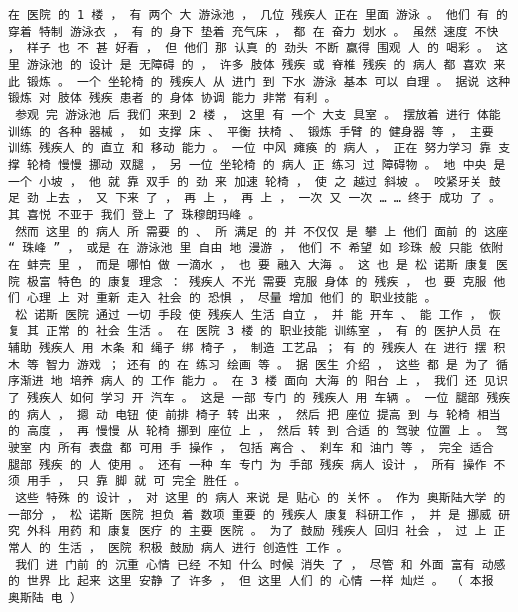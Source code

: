 \documentclass{article}
\begin{document}
\begin{Verbatim}[commandchars=\\\{\}]
 在 医院 的 1 楼 ， 有 两个 大 游泳池 ， 几位 残疾人 正在 里面 游泳 。 他们 有 的 穿着 特制 游泳衣 ， 有 的 身下 垫着 充气床 ， 都 在 奋力 划水 。 虽然 速度 不快 ， 样子 也 不 甚 好看 ， 但 他们 那 认真 的 劲头 不断 赢得 围观 人 的 喝彩 。 这里 游泳池 的 设计 是 无障碍 的 ， 许多 肢体 残疾 或 脊椎 残疾 的 病人 都 喜欢 来此 锻炼 。 一个 坐轮椅 的 残疾人 从 进门 到 下水 游泳 基本 可以 自理 。 据说 这种 锻炼 对 肢体 残疾 患者 的 身体 协调 能力 非常 有利 。 
 参观 完 游泳池 后 我们 来到 2 楼 ， 这里 有 一个 大支 具室 。 摆放着 进行 体能训练 的 各种 器械 ， 如 支撑 床 、 平衡 扶椅 、 锻炼 手臂 的 健身器 等 ， 主要 训练 残疾人 的 直立 和 移动 能力 。 一位 中风 瘫痪 的 病人 ， 正在 努力学习 靠 支撑 轮椅 慢慢 挪动 双腿 ， 另 一位 坐轮椅 的 病人 正 练习 过 障碍物 。 地 中央 是 一个 小坡 ， 他 就 靠 双手 的 劲 来 加速 轮椅 ， 使 之 越过 斜坡 。 咬紧牙关 鼓足 劲 上去 ， 又 下来 了 ， 再 上 ， 再 上 ， 一次 又 一次 … … 终于 成功 了 。 其 喜悦 不亚于 我们 登上 了 珠穆朗玛峰 。 
 然而 这里 的 病人 所 需要 的 、 所 满足 的 并 不仅仅 是 攀 上 他们 面前 的 这座 “ 珠峰 ” ， 或是 在 游泳池 里 自由 地 漫游 ， 他们 不 希望 如 珍珠 般 只能 依附 在 蚌壳 里 ， 而是 哪怕 做 一滴水 ， 也 要 融入 大海 。 这 也 是 松 诺斯 康复 医院 极富 特色 的 康复 理念 ： 残疾人 不光 需要 克服 身体 的 残疾 ， 也 要 克服 他们 心理 上 对 重新 走入 社会 的 恐惧 ， 尽量 增加 他们 的 职业技能 。 
 松 诺斯 医院 通过 一切 手段 使 残疾人 生活 自立 ， 并 能 开车 、 能 工作 ， 恢复 其 正常 的 社会 生活 。 在 医院 3 楼 的 职业技能 训练室 ， 有 的 医护人员 在 辅助 残疾人 用 木条 和 绳子 绑 椅子 ， 制造 工艺品 ； 有 的 残疾人 在 进行 摆 积木 等 智力 游戏 ； 还有 的 在 练习 绘画 等 。 据 医生 介绍 ， 这些 都 是 为了 循序渐进 地 培养 病人 的 工作 能力 。 在 3 楼 面向 大海 的 阳台 上 ， 我们 还 见识 了 残疾人 如何 学习 开 汽车 。 这是 一部 专门 的 残疾人 用 车辆 。 一位 腿部 残疾 的 病人 ， 摁 动 电钮 使 前排 椅子 转 出来 ， 然后 把 座位 提高 到 与 轮椅 相当 的 高度 ， 再 慢慢 从 轮椅 挪到 座位 上 ， 然后 转 到 合适 的 驾驶 位置 上 。 驾驶室 内 所有 表盘 都 可用 手 操作 ， 包括 离合 、 刹车 和 油门 等 ， 完全 适合 腿部 残疾 的 人 使用 。 还有 一种 车 专门 为 手部 残疾 病人 设计 ， 所有 操作 不须 用手 ， 只 靠 脚 就 可 完全 胜任 。 
 这些 特殊 的 设计 ， 对 这里 的 病人 来说 是 贴心 的 关怀 。 作为 奥斯陆大学 的 一部分 ， 松 诺斯 医院 担负 着 数项 重要 的 残疾人 康复 科研工作 ， 并 是 挪威 研究 外科 用药 和 康复 医疗 的 主要 医院 。 为了 鼓励 残疾人 回归 社会 ， 过 上 正常人 的 生活 ， 医院 积极 鼓励 病人 进行 创造性 工作 。 
 我们 进 门前 的 沉重 心情 已经 不知 什么 时候 消失 了 ， 尽管 和 外面 富有 动感 的 世界 比 起来 这里 安静 了 许多 ， 但 这里 人们 的 心情 一样 灿烂 。 （ 本报 奥斯陆 电 ） 

\end{Verbatim}
\end{document}
